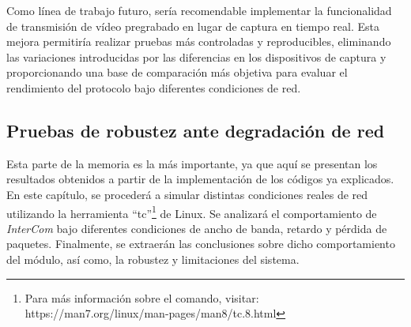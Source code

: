 Como línea de trabajo futuro, sería recomendable implementar la funcionalidad de transmisión de vídeo pregrabado en lugar de captura en tiempo real. Esta mejora permitiría realizar pruebas más controladas y reproducibles, eliminando las variaciones introducidas por las diferencias en los dispositivos de captura y proporcionando una base de comparación más objetiva para evaluar el rendimiento del protocolo bajo diferentes condiciones de red.
\newpage

\subsection{Pruebas de robustez ante degradación de red}

Esta parte de la memoria es la más importante, ya que aquí se presentan los resultados obtenidos a partir de la implementación de los códigos ya explicados. En este capítulo, se procederá a simular distintas condiciones reales de red utilizando la herramienta ``tc''\footnote{Para más información sobre el comando, visitar: https://man7.org/linux/man-pages/man8/tc.8.html} de Linux. Se analizará el comportamiento de \textit{InterCom} bajo diferentes condiciones de ancho de banda, retardo y pérdida de paquetes. Finalmente, se extraerán las conclusiones sobre dicho comportamiento del módulo, así como, la robustez y limitaciones del sistema.
\vspace{\baselineskip}

